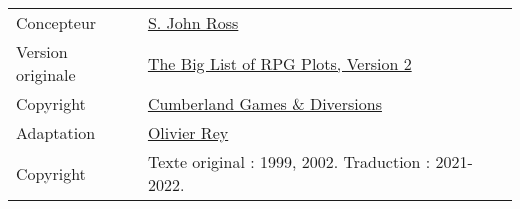 



\begin{center}
\begin{tabular}{ll}
Concepteur        & \href{https://rolltop-indigo.blogspot.com/}{S. John Ross} \\
Version originale & \href{https://ghalev.itch.io/big-list-of-rpg-plots}{The Big List of RPG Plots, Version 2} \\
Copyright         & \href{https://ghalev.itch.io/}{Cumberland Games \& Diversions} \\
Adaptation        & \href{https://rouboudou.itch.io}{Olivier Rey} \\
Copyright         & Texte original : 1999, 2002. Traduction : 2021-2022. \\
\end{tabular}
\end{center}

\vspace{1cm}

